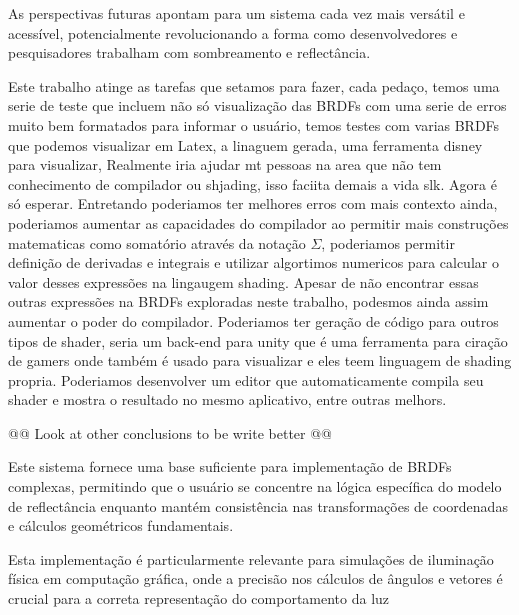 As perspectivas futuras apontam para um sistema cada vez mais versátil e acessível, potencialmente revolucionando a forma como desenvolvedores e pesquisadores trabalham com sombreamento e reflectância.


Este trabalho atinge as tarefas que setamos para fazer, cada pedaço, temos uma serie de teste que incluem não só visualização das BRDFs com uma serie de erros muito bem formatados para informar o usuário, temos testes com varias BRDFs que podemos visualizar em Latex, a linaguem gerada, uma ferramenta disney para visualizar, Realmente iria ajudar mt pessoas na area que não tem conhecimento de compilador ou shjading, isso faciita demais a vida slk. Agora é só esperar.
Entretando poderiamos ter melhores erros com mais contexto ainda, poderiamos aumentar as capacidades do compilador ao permitir mais construções matematicas como somatório através da notação $\Sigma$, poderiamos permitir definição de derivadas e integrais e utilizar algortimos numericos para calcular o valor desses expressões na lingaugem shading.  Apesar de não encontrar essas outras expressões na BRDFs exploradas neste trabalho, podesmos ainda assim aumentar o poder do compilador. Poderiamos ter geração de código para outros tipos de shader, seria um back-end para unity que é uma ferramenta para ciração de gamers onde também é usado para visualizar e eles teem linguagem de shading propria. Poderiamos desenvolver um editor que automaticamente compila seu shader e mostra o resultado no mesmo aplicativo, entre outras melhors. 

@@ Look at other conclusions to be write better @@

Este sistema fornece uma base suficiente para implementação de BRDFs complexas, permitindo que o usuário se concentre na lógica específica do modelo de reflectância enquanto mantém consistência nas transformações de coordenadas e cálculos geométricos fundamentais.

Esta implementação é particularmente relevante para simulações de iluminação física em computação gráfica, onde a precisão nos cálculos de ângulos e vetores é crucial para 
a correta representação do comportamento da luz
